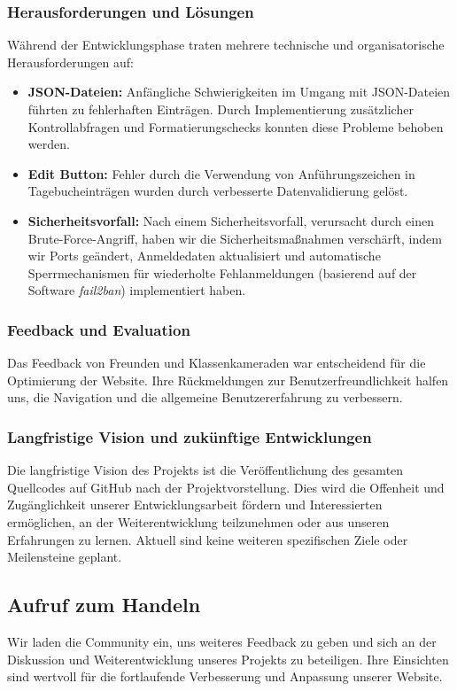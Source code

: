 \subsubsection{Herausforderungen und Lösungen}
Während der Entwicklungsphase traten mehrere technische und organisatorische Herausforderungen auf:
\begin{itemize}
    \item \textbf{JSON-Dateien:} Anfängliche Schwierigkeiten im Umgang mit JSON-Dateien führten zu fehlerhaften Einträgen. Durch Implementierung zusätzlicher Kontrollabfragen und Formatierungschecks konnten diese Probleme behoben werden.
    \item \textbf{Edit Button:} Fehler durch die Verwendung von Anführungszeichen in Tagebucheinträgen wurden durch verbesserte Datenvalidierung gelöst.
    \item \textbf{Sicherheitsvorfall:} Nach einem Sicherheitsvorfall, verursacht durch einen Brute-Force-Angriff, haben wir die Sicherheitsmaßnahmen verschärft, indem wir Ports geändert, Anmeldedaten aktualisiert und automatische Sperrmechanismen für wiederholte Fehlanmeldungen (basierend auf der Software \textit{fail2ban}) implementiert haben.
\end{itemize}

\subsubsection{Feedback und Evaluation}
Das Feedback von Freunden und Klassenkameraden war entscheidend für die Optimierung der Website. Ihre Rückmeldungen zur Benutzerfreundlichkeit halfen uns, die Navigation und die allgemeine Benutzererfahrung zu verbessern.

\subsubsection{Langfristige Vision und zukünftige Entwicklungen}
Die langfristige Vision des Projekts ist die Veröffentlichung des gesamten Quellcodes auf GitHub nach der Projektvorstellung. Dies wird die Offenheit und Zugänglichkeit unserer Entwicklungsarbeit fördern und Interessierten ermöglichen, an der Weiterentwicklung teilzunehmen oder aus unseren Erfahrungen zu lernen. Aktuell sind keine weiteren spezifischen Ziele oder Meilensteine geplant.

\subsection{Aufruf zum Handeln}
Wir laden die Community ein, uns weiteres Feedback zu geben und sich an der Diskussion und Weiterentwicklung unseres Projekts zu beteiligen. Ihre Einsichten sind wertvoll für die fortlaufende Verbesserung und Anpassung unserer Website.
